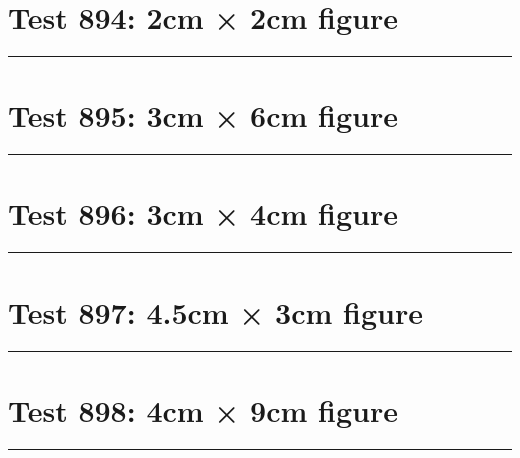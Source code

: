 \documentclass[a4paper,11pt]{article}
\begin{document}
\section*{Test 894: 2cm × 2cm figure}
\begin{swarmwrap}%
  \begin{minipage}[t]{2cm}
    \centering
    \rule{\linewidth}{2cm}
  \end{minipage}%
\end{swarmwrap}%
\swarmwrapnext
\lipsum[7]
\lipsum[8]
\lipsum[9]
\lipsum[10]
\lipsum[11]
\section*{Test 895: 3cm × 6cm figure}
\begin{swarmwrap}%
  \begin{minipage}[t]{3cm}
    \centering
    \rule{\linewidth}{6cm}
  \end{minipage}%
\end{swarmwrap}%
\swarmwrapnext
\lipsum[20]
\lipsum[21]
\lipsum[22]
\section*{Test 896: 3cm × 4cm figure}
\begin{swarmwrap}%
  \begin{minipage}[t]{3cm}
    \centering
    \rule{\linewidth}{4cm}
  \end{minipage}%
\end{swarmwrap}%
\swarmwrapnext
\lipsum[43]
\lipsum[44]
\lipsum[45]
\lipsum[46]
\lipsum[47]
\lipsum[48]
\section*{Test 897: 4.5cm × 3cm figure}
\begin{swarmwrap}%
  \begin{minipage}[t]{4cm}
    \centering
    \rule{\linewidth}{3cm}
  \end{minipage}%
\end{swarmwrap}%
\swarmwrapnext
\lipsum[88]
\lipsum[89]
\lipsum[90]
\section*{Test 898: 4cm × 9cm figure}
\begin{swarmwrap}%
  \begin{minipage}[t]{4cm}
    \centering
    \rule{\linewidth}{9cm}
  \end{minipage}%
\end{swarmwrap}%
\swarmwrapnext
\lipsum[112]
\lipsum[113]
\lipsum[114]
\end{document}
